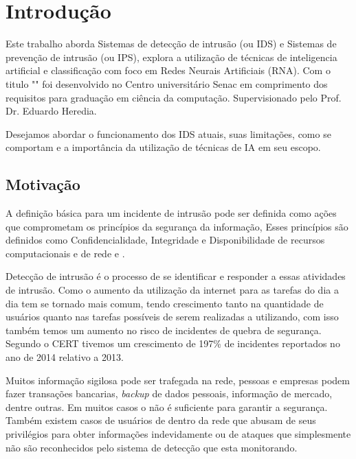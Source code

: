 
\chapter[Introdução]{Introdução}
Este trabalho aborda Sistemas de detecção de intrusão (\monoIDS ou IDS) e Sistemas de prevenção de intrusão (\monoIPS ou IPS), explora a utilização de técnicas de inteligencia artificial e classificação com foco em Redes Neurais Artificiais (RNA). Com o titulo "\monoTitulo"  foi desenvolvido no Centro universitário Senac em comprimento dos requisitos para graduação em ciência da computação. Supervisionado pelo Prof. Dr. Eduardo Heredia.

Desejamos abordar o funcionamento dos IDS atuais, suas limitações, como se comportam e a importância da utilização de técnicas de IA em seu escopo.
	
\section{Motivação}

A definição básica para um incidente de intrusão pode ser definida como ações que comprometam os princípios da segurança da informação, Esses princípios são definidos como Confidencialidade, Integridade e Disponibilidade de recursos computacionais e de rede \cite{whitman2011principles} e \cite{beer2011cybercrime}.  

Detecção de intrusão é o processo de se identificar e responder a essas atividades de intrusão. Como o aumento da utilização da internet para  as tarefas do dia a dia tem se tornado mais comum, tendo crescimento tanto na quantidade de usuários quanto nas tarefas possíveis de serem realizadas a utilizando, com isso também temos um aumento no risco de incidentes de quebra de segurança. Segundo o CERT \cite{CERT} tivemos um crescimento de 197\% de incidentes reportados no ano de 2014 relativo a 2013. 

Muitos informação sigilosa pode ser trafegada na rede, pessoas e empresas podem fazer transações bancarias, \textit{backup} de dados pessoais, informação de mercado, dentre outras. Em muitos casos o \monoFireWall não é suficiente para garantir a segurança. Também existem casos de usuários de dentro da rede que abusam de seus privilégios para obter informações indevidamente ou de ataques que simplesmente não são reconhecidos pelo sistema de detecção que esta monitorando.

